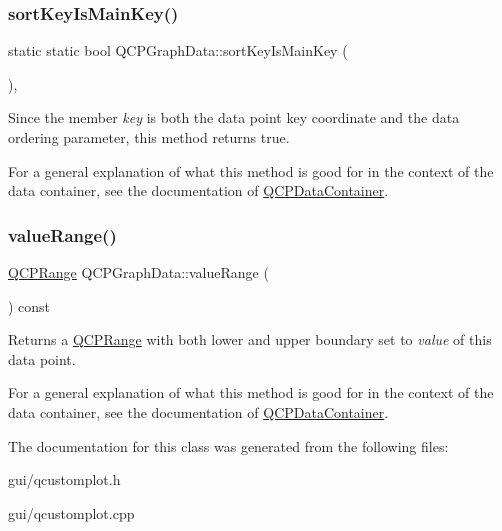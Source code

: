 \subsubsection{\texorpdfstring{sort\+Key\+Is\+Main\+Key()}{sortKeyIsMainKey()}}
{\footnotesize\ttfamily static static bool Q\+C\+P\+Graph\+Data\+::sort\+Key\+Is\+Main\+Key (\begin{DoxyParamCaption}{ }\end{DoxyParamCaption})\hspace{0.3cm}{\ttfamily [inline]}, {\ttfamily [static]}}

Since the member {\itshape key} is both the data point key coordinate and the data ordering parameter, this method returns true.

For a general explanation of what this method is good for in the context of the data container, see the documentation of \hyperlink{classQCPDataContainer}{Q\+C\+P\+Data\+Container}. \mbox{\label{classQCPGraphData_a2f8dd30360356f66cc418a170a9f3792}} 
\subsubsection{\texorpdfstring{value\+Range()}{valueRange()}}
{\footnotesize\ttfamily \hyperlink{classQCPRange}{Q\+C\+P\+Range} Q\+C\+P\+Graph\+Data\+::value\+Range (\begin{DoxyParamCaption}{ }\end{DoxyParamCaption}) const\hspace{0.3cm}{\ttfamily [inline]}}

Returns a \hyperlink{classQCPRange}{Q\+C\+P\+Range} with both lower and upper boundary set to {\itshape value} of this data point.

For a general explanation of what this method is good for in the context of the data container, see the documentation of \hyperlink{classQCPDataContainer}{Q\+C\+P\+Data\+Container}. 

The documentation for this class was generated from the following files\+:\begin{DoxyCompactItemize}
\item 
gui/qcustomplot.\+h\item 
gui/qcustomplot.\+cpp\end{DoxyCompactItemize}
